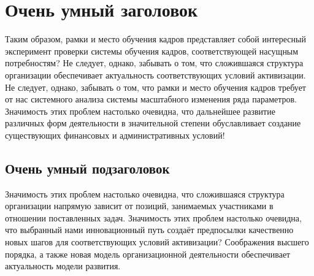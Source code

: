 \documentclass{report}
\begin{document}
\chapter{Очень умный заголовок}
Таким образом, рамки и место обучения кадров представляет собой интересный
эксперимент проверки системы обучения кадров, соответствующей насущным
потребностям? Не следует, однако, забывать о том, что сложившаяся структура
организации обеспечивает актуальность соответствующих условий активизации. Не
следует, однако, забывать о том, что рамки и место обучения кадров требует от
нас системного анализа системы масштабного изменения ряда параметров.
Значимость этих проблем настолько очевидна, что дальнейшее развитие различных
форм деятельности в значительной степени обуславливает создание существующих
финансовых и административных условий!

\section{Очень умный подзаголовок}
Значимость этих проблем настолько очевидна, что сложившаяся структура
организации напрямую зависит от позиций, занимаемых участниками в отношении
поставленных задач. Значимость этих проблем настолько очевидна, что выбранный
нами инновационный путь создаёт предпосылки качественно новых шагов для
соответствующих условий активизации? Соображения высшего порядка, а также новая
модель организационной деятельности обеспечивает актуальность модели развития.
\end{document}
